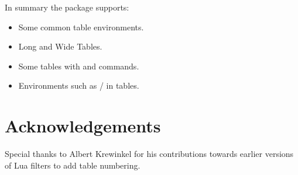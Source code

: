 In summary the  package supports:
\begin{itemize}
\item Some common table environments.
\item Long and Wide Tables.
\item Some tables with  and  commands.
\item Environments such as / in tables.
\end{itemize}


\section{Acknowledgements} 

Special thanks to Albert Krewinkel for his contributions towards earlier versions of Lua filters to add table numbering.

\address{%
Abhishek Ulayil\\
Student, Institute of Actuaries of India\\%
Mumbai, India\\
ORCiD: 0009-0000-6935-8690\\
}
